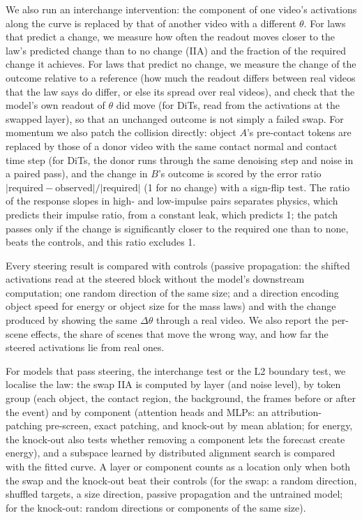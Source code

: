 \documentclass[10pt]{article}
\begin{document}
We also run an interchange intervention: the component of one video's activations along the curve is replaced by
that of another video with a different $\theta$. For laws that predict a change, we measure how often the readout moves
closer to the law's predicted change than to no change (IIA) and the fraction of the required change it achieves. For
laws that predict no change, we measure the change of the outcome relative to a reference (how much the readout
differs between real videos that the law says do differ, or else its spread over real videos), and check that the
model's own readout of $\theta$ did move (for DiTs, read from the activations at the swapped layer), so that an unchanged
outcome is not simply a failed swap. For momentum we also
patch the collision directly: object $A$'s pre-contact tokens are replaced by those of a donor video with the same
contact normal and contact time step (for DiTs, the donor runs through the same denoising step and noise in a paired
pass), and the change in $B$'s outcome is scored by the error ratio $|\text{required}-\text{observed}|/|\text{required}|$
(1 for no change) with a sign-flip test. The ratio of the response slopes in high- and low-impulse pairs separates
physics, which predicts their impulse ratio, from a constant leak, which predicts 1; the patch passes only if the
change is significantly closer to the required one than to none, beats the controls, and this ratio excludes 1.

Every steering result is compared with controls (passive propagation: the shifted activations read at the steered
block without the model's downstream computation; one random direction of the same size; and a direction encoding
object speed for energy or object size for the mass laws) and with the change produced by showing the same
$\Delta\theta$ through a real video. We also report the per-scene effects, the share of scenes that move the wrong way,
and how far the steered activations lie from real ones.

For models that pass steering, the interchange test or the L2 boundary test, we localise the law: the swap IIA is
computed by layer (and noise level), by token group (each object, the contact region, the background, the frames
before or after the event) and by component (attention heads and MLPs: an attribution-patching pre-screen, exact
patching, and knock-out by mean ablation; for energy, the knock-out also tests whether removing a component lets the
forecast create energy), and a subspace learned by distributed alignment search is compared with the fitted curve. A
layer or component counts as a location only when both the swap and the knock-out beat their controls (for the swap:
a random direction, shuffled targets, a size direction, passive propagation and the untrained model; for the
knock-out: random directions or components of the same size).
\end{document}
